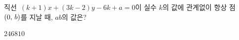 직선~$(k+1)x+(3k-2)y-6k+a=0$이 실수 $k$의 값에 관계없이 항상 점~$(0,\mkern3mu b)$를 지날 때, $ab$의 값은? 
\begin{choices32}{$2$}{$4$}{$6$}{$8$}{$10$}\end{choices32}
